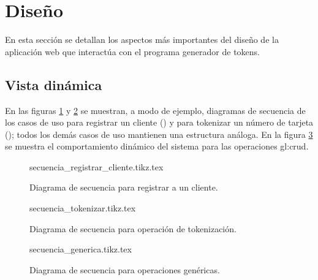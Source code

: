 %
%

\section{Diseño}

En esta sección se detallan los aspectos más importantes del diseño de la
aplicación web que interactúa con el programa generador de tokens.

\subsection{Vista dinámica}

En las figuras \ref{fig:secuencia_registrar_cliente} y
\ref{fig:secuencia_tokenizar} se muestran, a modo de ejemplo, diagramas de
secuencia de los casos de uso para registrar un cliente
() y para tokenizar un número de tarjeta
(); todos los demás casos de uso mantienen
una estructura análoga. En la figura \ref{fig:secuencia_generia} se muestra el
comportamiento dinámico del sistema para las operaciones \gls{gl:crud}.

%
%

\begin{figure}
  \begin{center}
    {secuencia_registrar_cliente.tikz.tex}
    \caption{Diagrama de secuencia para registrar a un cliente.}
    \label{fig:secuencia_registrar_cliente}
  \end{center}
\end{figure}

\begin{figure}
  \begin{center}
    {secuencia_tokenizar.tikz.tex}
    \caption{Diagrama de secuencia para operación de tokenización.}
    \label{fig:secuencia_tokenizar}
  \end{center}
\end{figure}

\begin{figure}
  \begin{center}
    {secuencia_generica.tikz.tex}
    \caption{Diagrama de secuencia para operaciones genéricas.}
    \label{fig:secuencia_generia}
  \end{center}
\end{figure}
